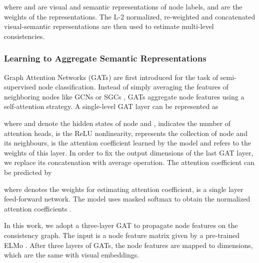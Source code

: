 \documentclass[sigconf,screen]{acmart}
\begin{document}
where  and  are visual and semantic representations of node labels,  and  are the weights of the representations. The L-2 normalized, re-weighted and concatenated visual-semantic representations are then used to estimate multi-level consistencies.

\subsubsection{Learning to Aggregate Semantic Representations}

Graph Attention Networks (GATs) \cite{velickovic2018graph} are first introduced for the task of semi-supervised node classification. Instead of simply averaging the features of neighboring nodes like GCNs \cite{kipf2016semi} or SGCs \cite{wu2019simplifying}, GATs aggregate node features using a self-attention strategy. A single-level GAT layer can be represented as

where  and  denote the hidden states of node  and ,  indicates the number of attention heads,  is the ReLU nonlinearity,  represents the collection of node  and its neighbours,  is the attention coefficient learned by the model and  refers to the weights of this layer. In order to fix the output dimensions of the last GAT layer, we replace its concatenation with average operation. The attention coefficient  can be predicted by

where  denotes the weights for estimating attention coefficient,  is a single layer feed-forward network. The model uses masked softmax to obtain the normalized attention coefficients .

In this work, we adopt a three-layer GAT to propagate node features on the consistency graph. The input is a node feature matrix  given by a pre-trained ELMo \cite{peters2018deep}. After three layers of GATs, the node features are mapped to  dimensions, which are the same with visual embeddings.
\end{document}
